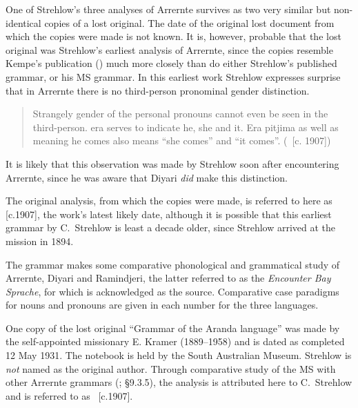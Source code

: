 One of Strehlow’s three analyses of Arrernte survives as two very similar but non-identical copies of a lost original. The date of the original lost document from which the copies were made is not known. It is, however, probable that the lost original was Strehlow’s earliest analysis of Arrernte, since the copies resemble Kempe’s publication (\citeyear{kempe_grammar_1891}) much more closely than do either Strehlow’s \citeyear{strehlow_einige_1908} published grammar, or his \citeyear{strehlow_notitle_1910} MS grammar. In this earliest work Strehlow expresses surprise that in Arrernte there is no third-person pronominal gender distinction.

\begin{quote}
Strangely gender of the personal pronouns cannot even be seen in the third-person. era serves to indicate he, she and it. Era pitjima as well as meaning he comes also means “she comes” and “it comes''. (\citealt[30--31]{strehlow_grammatik_1931}~[c. 1907])
\end{quote}

It is likely that this observation was made by Strehlow soon after encountering Arrernte, since he was aware that Diyari \textit{did} make this distinction.

The original analysis, from which the copies were made, is referred to here as [c.1907], the work’s latest likely date, although it is possible that this earliest grammar by C.~Strehlow is least a decade older, since Strehlow arrived at the mission in 1894.

The grammar makes some comparative phonological and grammatical study of Arrernte, Diyari and Ramindjeri, the latter referred to as the \textit{Encounter Bay Sprache}, for which \citet{meyer_vocabulary_1843} is acknowledged as the source. Comparative case paradigms for nouns and pronouns are given in each number for the three languages.

One copy of the lost original ``Grammar of the Aranda language'' was made by the self-appointed missionary E. Kramer (1889--1958) and is dated as completed 12 May 1931. The notebook is held by the South Australian Museum. Strehlow is \textit{not} named as the original author. Through comparative study of the MS with other Arrernte grammars (\citealt{Stockigt2017}; §9.3.5), the analysis is attributed here to C.~Strehlow and is referred to as \citet{strehlow_untitled_1931}~[c.1907].

